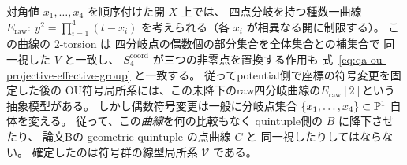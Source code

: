 \begin{remark}[四点分岐曲線の二捩れ局所系との対応]
\label{rem:qa-ou-ramification-2torsion-local-system}
対角値 $x_1,\ldots,x_4$ を順序付けた開 $X$ 上では、
四点分岐を持つ種数一曲線
$E_{\mathrm{raw}}:\ y^2=\prod_{i=1}^4(t-x_i)$
を考えられる（各 $x_i$ が相異なる開に制限する）。
この曲線の $2$-torsion は
四分岐点の偶数個の部分集合を全体集合との補集合で
同一視した $V$ と一致し、
$S_4^{\mathrm{coord}}$ が三つの非零点を置換する作用も
式~\eqref{eq:qa-ou-projective-effective-group} と一致する。
従ってpotential側で座標の符号変更を固定した後の
OU符号局所系には、この未降下のraw四分岐曲線の$E_{\mathrm{raw}}[2]$という抽象模型がある。
しかし偶数符号変更は一般に分岐点集合
$\{x_1,\ldots,x_4\}\subset\mathbb P^1$ 自体を変える。
従って、この\emph{曲線}を何の比較もなく
quintuple側の $B$ に降下させたり、
論文Bの geometric quintuple の点曲線 $C$ と
同一視したりしてはならない。
確定したのは符号群の線型局所系 $\mathcal V$ である。
\end{remark}


